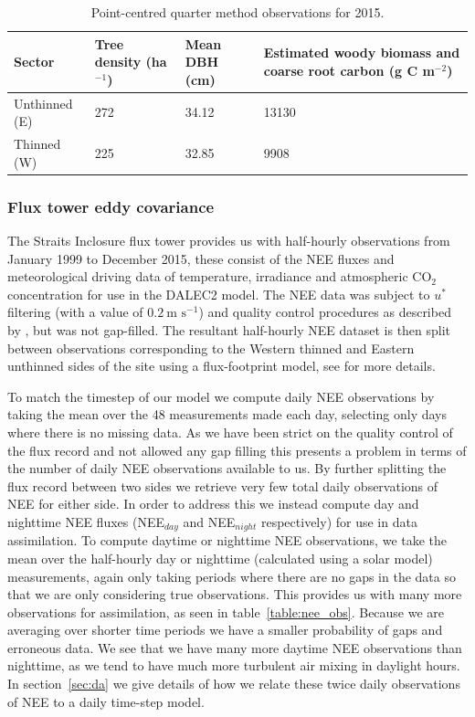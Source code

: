 \documentclass[draft,linenumbers]{agujournal}
\begin{document}
\begin{table}[ht] 
	\caption{Point-centred quarter method observations for 2015.}
\begin{center}
	\begin{tabular}{| l | p{2cm} | p{2cm} | p{4.5cm} |}
	\hline
	Sector & Tree density (ha\(^{-1}\)) & Mean DBH (cm) & Estimated woody biomass and coarse root carbon (g C m\(^{-2}\)) \\ \hline
	Unthinned (E) & 272 & 34.12 & 13130 \\ \hline
	Thinned (W) & 225 & 32.85 & 9908 \\ \hline
	\end{tabular}
	\label{table:cwoo_obs}
\end{center} 
\end{table}

\subsubsection{Flux tower eddy covariance} \label{sec:eddycov} 

The Straits Inclosure flux tower provides us with half-hourly observations from January 1999 to December 2015, these consist of the NEE fluxes and meteorological driving data of temperature, irradiance and atmospheric CO\(_{2}\) concentration for use in the DALEC2 model. The NEE data was subject to \(u^*\) filtering (with a value of \(0.2~\text{m s}^{-1}\)) and quality control procedures as described by \citet{papale2006towards}, but was not gap-filled. The resultant half-hourly NEE dataset is then split between observations corresponding to the Western thinned and Eastern unthinned sides of the site using a flux-footprint model, see \citet{wilkinson2015effects} for more details.  

To match the timestep of our model we compute daily NEE observations by taking the mean over the 48 measurements made each day, selecting only days where there is no missing data. As we have been strict on the quality control of the flux record and not allowed any gap filling this presents a problem in terms of the number of daily NEE observations available to us. By further splitting the flux record between two sides we retrieve very few total daily observations of NEE for either side. In order to address this we instead compute day and nighttime NEE fluxes (NEE\(_{day}\) and NEE\(_{night}\) respectively) for use in data assimilation. To compute daytime or nighttime NEE observations, we take the mean over the half-hourly day or nighttime (calculated using a solar model) measurements, again only taking periods where there are no gaps in the data so that we are only considering true observations. This provides us with many more observations for assimilation, as seen in table~\ref{table:nee_obs}. Because we are averaging over shorter time periods we have a smaller probability of gaps and erroneous data. We see that we have many more daytime NEE observations than nighttime, as we tend to have much more turbulent air mixing in daylight hours. In section~\ref{sec:da} we give details of how we relate these twice daily observations of NEE to a daily time-step model.     
\end{document}
